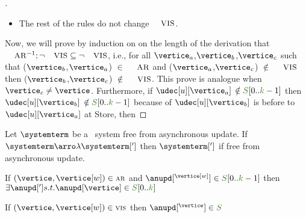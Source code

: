 \begin{proof}[]
\begin{itemize}
\begin{itemize}
\begin{itemize}
				\end{itemize}
				
			\item The rest of the rules do not change $\textsc{\small{VIS}}$.

\end{itemize}

\end{itemize}

Now, we will prove by induction on on the length of the derivation that $\textsc{\small{AR}}^{-1};\neg\textsc{\small{VIS}} \subseteq \neg\textsc{\small{VIS}}$, i.e., for all $\vertice_a$,$\vertice_b$,$\vertice_c$ such that ($\vertice_b$,$\vertice_a$) $\in$ $\textsc{\small{AR}}$ and ($\vertice_a$,$\vertice_c$) $\notin$ $\textsc{\small{VIS}}$ then ($\vertice_b$,$\vertice_c$) $\notin$ $\textsc{\small{VIS}}$. This prove is analogue when $\vertice_c \neq \vertice$. Furthermore, if $\udec[u][\vertice_a]$ $\notin \queuemessage[0..\tknown-1]$ then $\udec[u][\vertice_b]$ $\notin \queuemessage[0..\tknown-1]$ because of $\udec[u][\vertice_b]$ is before to $\udec[u][\vertice_a]$ at Store, then 
\end{proof}
	


\begin{lemma}\label{lemma:empty_queue} 
Let $\systemterm$  be a \gsp\ system free from asynchronous update. If $\systemterm\arroi{\lambda}\systemterm[']$ 
then $\systemterm[']$ if free from asynchronous update. 
\end{lemma}


\begin{lemma}\label{lemma:vertice_arb_store} 
If $(\vertice,\vertice[w])\in\arb$ and $\anupd[^{\vertice[w]}] \in \queuemessage[0 .. \tknown - 1]$ then $\exists \anupd['] s.t. \anupd[\vertice] \in \queuemessage[0 .. \tknown]$
\end{lemma}


\begin{lemma}\label{lemma:vertice_vis_store} 
If $(\vertice,\vertice[w])\in\vis$ then $\anupd[^{\vertice}] \in \queuemessage$
\end{lemma}

